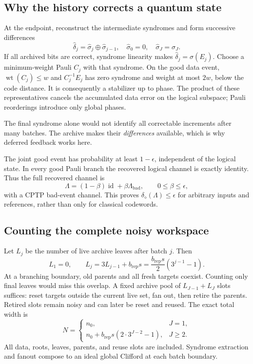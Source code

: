 \documentclass[11pt,a4paper]{article}
\numberwithin{equation}{section}
\theoremstyle{remark}\newtheorem*{remark}{Interpretation}
\newcommand{\id}{\operatorname{id}}
\newcommand{\wt}{\operatorname{wt}}
\newcommand{\eps}{\epsilon}
\newcommand{\dd}{\delta_{\diamond}}
\newcommand{\xor}{\oplus}
\begin{document}
\subsection{Why the history corrects a quantum state}
At the endpoint, reconstruct the intermediate syndromes and form successive differences
\begin{equation}
\widehat\delta_j=\widehat\sigma_j\xor\widehat\sigma_{j-1},
\quad\widehat\sigma_0=0,\quad\widehat\sigma_J=\sigma_J.
\end{equation}
If all archived bits are correct, syndrome linearity makes $\widehat\delta_j=\sigma(E_j)$. Choose a minimum-weight Pauli $C_j$ with that syndrome. On the good data event, $\wt(C_j)\le w$ and $C_j^{-1}E_j$ has zero syndrome and weight at most $2w$, below the code distance. It is consequently a stabilizer up to phase. The product of these representatives cancels the accumulated data error on the logical subspace; Pauli reorderings introduce only global phases.

The final syndrome alone would not identify all correctable increments after many batches. The archive makes their \emph{differences} available, which is why deferred feedback works here.

The joint good event has probability at least $1-\eps$, independent of the logical state. In every good Pauli branch the recovered logical channel is exactly identity. Thus the full recovered channel is
\begin{equation}
\Lambda=(1-\beta)\id+\beta\Lambda_{\mathrm{bad}},
\qquad0\le\beta\le\eps,
\end{equation}
with a CPTP bad-event channel. This proves $\dd(\Lambda)\le\eps$ for arbitrary inputs and references, rather than only for classical codewords.

\subsection{Counting the complete noisy workspace}
Let $L_j$ be the number of live archive leaves after batch $j$. Then
\begin{equation}
L_1=0,\qquad L_j=3L_{j-1}+b_{\mathrm{rep}}s
=\frac{b_{\mathrm{rep}}s}{2}(3^{j-1}-1).
\end{equation}
At a branching boundary, old parents and all fresh targets coexist. Counting only final leaves would miss this overlap. A fixed archive pool of $L_{J-1}+L_J$ slots suffices: reset targets outside the current live set, fan out, then retire the parents. Retired slots remain noisy and can later be reset and reused. The exact total width is
\begin{equation}
N=\begin{cases}
n_0,&J=1,\\
n_0+b_{\mathrm{rep}}s(2\cdot3^{J-2}-1),&J\ge2.
\end{cases}
\end{equation}
All data, roots, leaves, parents, and reuse slots are included. Syndrome extraction and fanout compose to an ideal global Clifford at each batch boundary.
\end{document}
